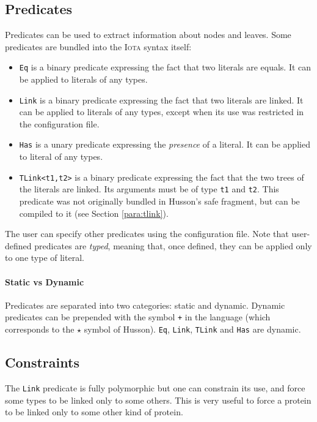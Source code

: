\documentclass[10pt,a4paper]{article}
\newcommand\Iota{\textsc{Iota}}
\newcommand{\ocaml}{\texttt}
\begin{document}
\subsection{Predicates}
\label{subsec:predicates}
Predicates can be used to extract information about nodes and leaves. Some predicates are bundled into the \Iota{} syntax itself:
\begin{itemize}
\item \ocaml{Eq} is a binary predicate expressing the fact that two literals are equals. It can be applied to literals of any types.
\item \ocaml{Link} is a binary predicate expressing the fact that two literals are linked. It can be applied to literals of any types, except when its use was restricted in the configuration file.
\item \ocaml{Has} is a unary predicate expressing the \emph{presence} of a literal. It can be applied to literal of any types.
\item \ocaml{TLink<t1,t2>} is a binary predicate expressing the fact that the two trees of the literals are linked. Its arguments must be of type \ocaml{t1} and \ocaml{t2}. This predicate was not originally bundled in Husson's safe fragment, but can be compiled to it (see Section \ref{para:tlink}).
\end{itemize}

The user can specify other predicates using the configuration file. Note that user-defined predicates are \emph{typed}, meaning that, once defined, they can be applied only to one type of literal.

\paragraph{Static vs Dynamic}
Predicates are separated into two categories: static and dynamic. Dynamic predicates can be prepended with the symbol \ocaml{+} in the language (which corresponds to the $\star$ symbol of Husson). \ocaml{Eq}, \ocaml{Link}, \ocaml{TLink} and \ocaml{Has} are dynamic.

\subsection{Constraints}
The \ocaml{Link} predicate is fully polymorphic but one can constrain its use, and force some types to be linked only to some others. This is very useful to force a protein to be linked only to some other kind of protein.
\end{document}
